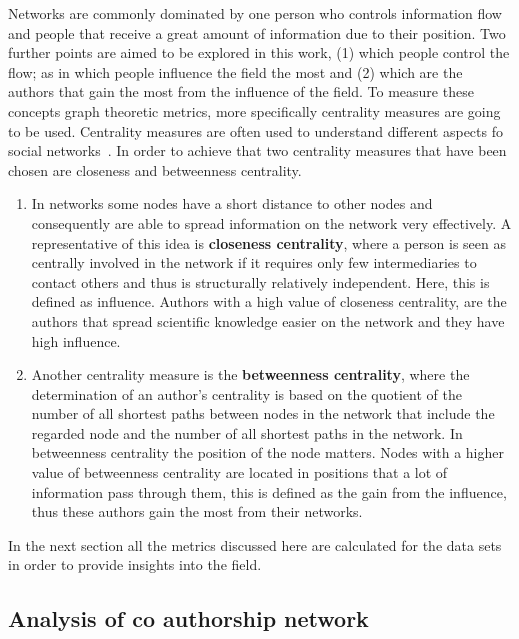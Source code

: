 \documentclass{article}
\theoremstyle{definition}
\begin{document}
Networks are commonly dominated by one person who controls information flow and
people that receive a great amount of information due to their position.
Two further points are aimed to be explored in this work, (1) which people control the flow;
as in which people influence the field the most and (2) which are the authors that
gain the most from the influence of the field. To measure these concepts graph
theoretic metrics, more specifically centrality measures are going to be used.
Centrality measures are often used to understand different
aspects fo social networks~\cite{Landherr2010}. In order to achieve that two
centrality measures that have been chosen are closeness and betweenness
centrality.

\begin{enumerate}
    \item In networks some nodes have a short distance to other nodes and consequently
    are able to spread information on the network very effectively.
    A representative of this idea is \textbf{closeness centrality}, where a person is seen
    as centrally involved in the network if it requires only few intermediaries
    to contact others and thus is structurally relatively independent. Here,
    this is defined as influence. Authors with a high value of closeness centrality,
    are the authors that spread scientific knowledge easier on the network
    and they have high influence.
    \item Another centrality measure is the \textbf{betweenness centrality},
    where the determination of an author's centrality is based on the quotient of
    the number of all shortest paths between nodes in the network that include
    the regarded node and the number of all shortest paths in the network.
    In betweenness centrality the position of the node matters. Nodes
    with a higher value of betweenness centrality are located in positions that
    a lot of information pass through them, this is defined as the gain from
    the influence, thus these authors gain the most from their networks.
\end{enumerate}

In the next section all the metrics discussed here are calculated for the data
sets in order to provide insights into the field.

\subsection{Analysis of co authorship network}\label{section:results}
\end{document}
